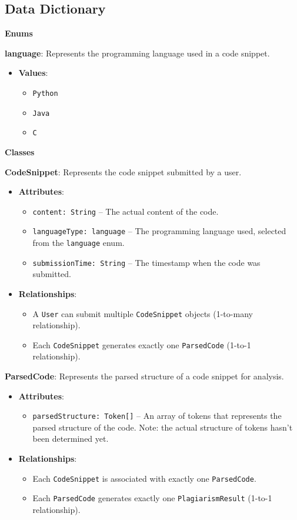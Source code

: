 \documentclass[12pt]{article}
\begin{document}
\subsection{Data Dictionary}

\textbf{Enums}

\textbf{language}: Represents the programming language used in a code snippet.
\begin{itemize}
    \item \textbf{Values}:
    \begin{itemize}
        \item \texttt{Python}
        \item \texttt{Java}
        \item \texttt{C}
    \end{itemize}
\end{itemize}

\textbf{Classes}

\textbf{CodeSnippet}: Represents the code snippet submitted by a user.
\begin{itemize}
    \item \textbf{Attributes}:
    \begin{itemize}
        \item \texttt{content: String} -- The actual content of the code.
        \item \texttt{languageType: language} -- The programming language used, selected from the \texttt{language} enum.
        \item \texttt{submissionTime: String} -- The timestamp when the code was submitted.
    \end{itemize}
    \item \textbf{Relationships}:
    \begin{itemize}
        \item A \texttt{User} can submit multiple \texttt{CodeSnippet} objects (1-to-many relationship).
        \item Each \texttt{CodeSnippet} generates exactly one \texttt{ParsedCode} (1-to-1 relationship).
    \end{itemize}
\end{itemize}

\textbf{ParsedCode}: Represents the parsed structure of a code snippet for analysis.
\begin{itemize}
    \item \textbf{Attributes}:
    \begin{itemize}
        \item \texttt{parsedStructure: Token[]} -- An array of tokens that represents the parsed structure of the code. Note: the actual structure of tokens hasn't been determined yet.
    \end{itemize}
    \item \textbf{Relationships}:
    \begin{itemize}
        \item Each \texttt{CodeSnippet} is associated with exactly one \texttt{ParsedCode}.
        \item Each \texttt{ParsedCode} generates exactly one \texttt{PlagiarismResult} (1-to-1 relationship).
    \end{itemize}
\end{itemize}
\end{document}
